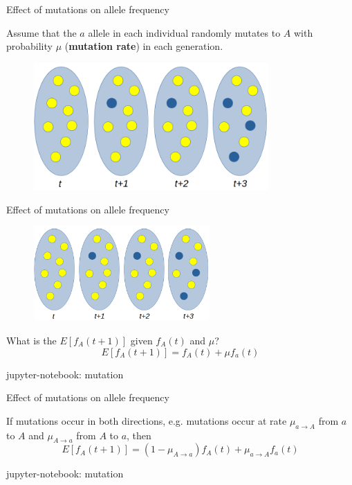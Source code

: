 \begin{frame}{Effect of mutations on allele frequency}

	\bigskip

	Assume that the $a$ allele in each individual randomly mutates to $A$ with probability $\mu$ 
	(\textbf{mutation rate}) in each generation.

	\begin{figure}
                \includegraphics[width=0.8\textwidth]{Pics/mutation}
        \end{figure}


\end{frame}

\begin{frame}{Effect of mutations on allele frequency}

        \begin{figure}
                \includegraphics[width=0.6\textwidth]{Pics/mutation}
        \end{figure}

	What is the $E[f_A(t+1)]$ given $f_A(t)$ and $\mu$?
	\pause
	\begin{equation}
		E[f_A(t+1)] = f_A(t) + \mu f_a(t)
	\end{equation}

	\tiny{jupyter-notebook: mutation}

\end{frame}


\begin{frame}{Effect of mutations on allele frequency}

	If mutations occur in both directions, e.g. mutations occur at rate $\mu_{a \rightarrow A}$ from $a$
	to $A$ and $\mu_{A \rightarrow a}$ from $A$ to $a$, then
	\begin{equation}
		E[f_A(t+1)] = (1 - \mu_{A \rightarrow a} ) f_A(t) + \mu_{a \rightarrow A} f_a(t)
	\end{equation}

	\bigskip
	\tiny{jupyter-notebook: mutation}

\end{frame}


